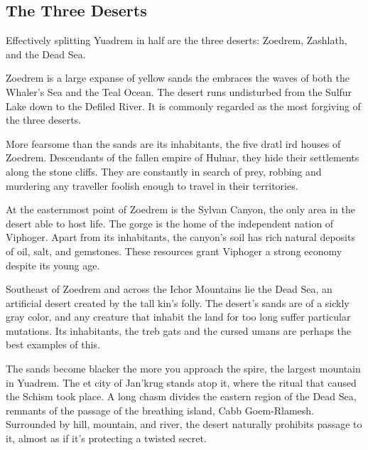 

\subsection*{The Three Deserts} \label{ssec::threedeserts}
Effectively splitting Yuadrem in half are the three deserts: Zoedrem, Zashlath, and the Dead Sea.

Zoedrem is a large expanse of yellow sands the embraces the waves of both the Whaler's Sea and the Teal Ocean.
The desert runs undisturbed from the Sulfur Lake down to the Defiled River.
It is commonly regarded as the most forgiving of the three deserts.

More fearsome than the sands are its inhabitants, the five dratl ird houses of Zoedrem.
Descendants of the fallen empire of Hulnar, they hide their settlements along the stone cliffs.
They are constantly in search of prey, robbing and murdering any traveller foolish enough to travel in their territories.

At the easternmost point of Zoedrem is the Sylvan Canyon, the only area in the desert able to host life.
The gorge is the home of the independent nation of Viphoger.
Apart from its inhabitants, the canyon's soil has rich natural deposits of oil, salt, and gemstones.
These resources grant Viphoger a strong economy despite its young age.

Southeast of Zoedrem and across the Ichor Mountains lie the Dead Sea, an artificial desert created by the tall kin's folly.
The desert's sands are of a sickly gray color, and any creature that inhabit the land for too long suffer particular mutations.
Its inhabitants, the treb gats and the cursed umans are perhaps the best examples of this.

The sands become blacker the more you approach the spire, the largest mountain in Yuadrem.
The et city of Jan'krug stands atop it, where the ritual that caused the Schism took place.
A long chasm divides the eastern region of the Dead Sea, remnants of the passage of the breathing island, Cabb Goem-Rlamesh.
Surrounded by hill, mountain, and river, the desert naturally prohibits passage to it, almost as if it's protecting a twisted secret.

